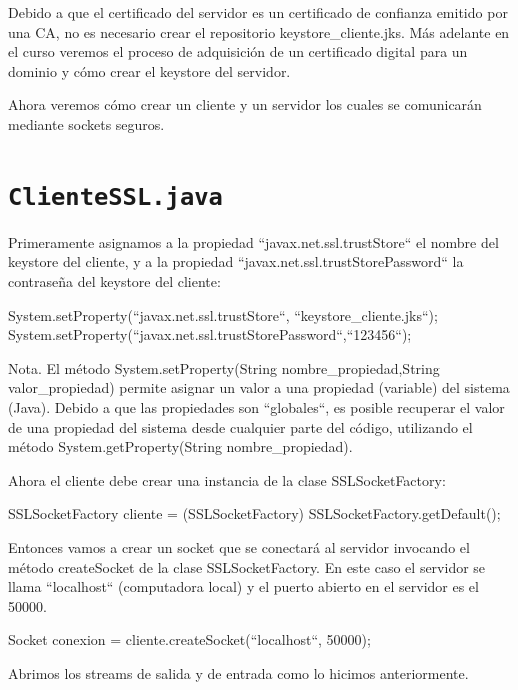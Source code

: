 \documentclass[11pt,a4paper,oneside]{book}
\begin{document}
Debido a que el certificado del servidor es un certificado de confianza emitido por una CA, no es necesario crear el repositorio keystore\_cliente.jks. Más adelante en el curso veremos el proceso de adquisición de un certificado digital para un dominio y cómo crear el keystore del servidor.

Ahora veremos cómo crear un cliente y un servidor los cuales se comunicarán mediante sockets seguros.

\section{\texttt{ClienteSSL.java}}

Primeramente asignamos a la propiedad ``javax.net.ssl.trustStore`` el nombre del keystore del cliente, y a la propiedad ``javax.net.ssl.trustStorePassword`` la contraseña del keystore del cliente:

\begin{SourceCode}
System.setProperty(``javax.net.ssl.trustStore``, ``keystore_cliente.jks``);
System.setProperty(``javax.net.ssl.trustStorePassword``,``123456``);
\end{SourceCode}

Nota. El método System.setProperty(String nombre\_propiedad,String valor\_propiedad) permite asignar un valor a una propiedad (variable) del sistema (Java). Debido a que las propiedades son ``globales``, es posible recuperar el valor de una propiedad del sistema desde cualquier parte del código, utilizando el método System.getProperty(String nombre\_propiedad).

Ahora el cliente debe crear una instancia de la clase SSLSocketFactory:

\begin{SourceCode}
SSLSocketFactory cliente = (SSLSocketFactory) SSLSocketFactory.getDefault();
\end{SourceCode}

Entonces vamos a crear un socket que se conectará al servidor invocando el método createSocket de la clase SSLSocketFactory. En este caso el servidor se llama ``localhost`` (computadora local) y el puerto abierto en el servidor es el 50000.

\begin{SourceCode}
Socket conexion = cliente.createSocket(``localhost``, 50000);
\end{SourceCode}

Abrimos los streams de salida y de entrada como lo hicimos anteriormente.
\end{document}
